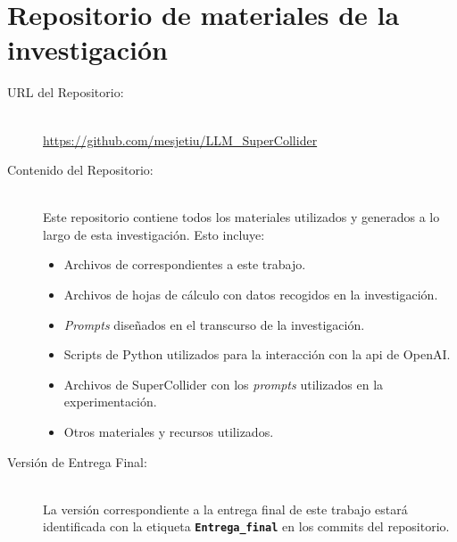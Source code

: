 \chapter{Repositorio de materiales de la investigación}
\label{anexo:repositorio}

\begin{center}
\end{center}

\begin{description}
    \item[URL del Repositorio:] \hfill \\
    \url{https://github.com/mesjetiu/LLM_SuperCollider}
    
    \item[Contenido del Repositorio:] \hfill \\
    Este repositorio contiene todos los materiales utilizados y generados a lo largo de esta investigación. Esto incluye:
    \begin{itemize}
        \item Archivos de  correspondientes a este trabajo.
        \item Archivos de hojas de cálculo con datos recogidos en la investigación.
        \item \emph{Prompts} diseñados en el transcurso de la investigación.
        \item Scripts de Python utilizados para la interacción con la \gls{api} de OpenAI.
        \item Archivos de SuperCollider con los \emph{prompts} utilizados en la experimentación.
        \item Otros materiales y recursos utilizados.
    \end{itemize}
    
    \item[Versión de Entrega Final:] \hfill \\
    La versión correspondiente a la entrega final de este trabajo estará identificada con la etiqueta \textbf{\texttt{Entrega\_final}} en los commits del repositorio.

\end{description}



